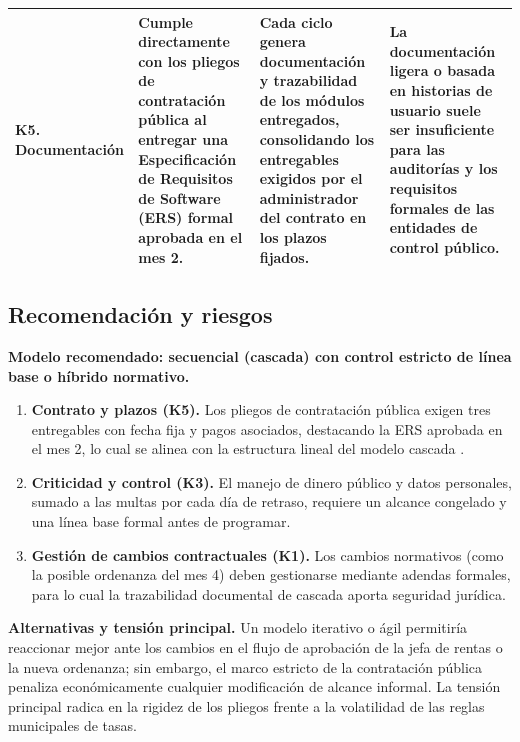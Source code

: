 \documentclass[11pt,a4paper]{article}
\begin{document}
\begin{xltabular}{\textwidth}{|p{0.17\textwidth}|X|X|X|}
K5. Documentación &
Cumple directamente con los pliegos de contratación pública al entregar una Especificación de Requisitos de Software (ERS) formal aprobada en el mes 2. &
Cada ciclo genera documentación y trazabilidad de los módulos entregados, consolidando los entregables exigidos por el administrador del contrato en los plazos fijados. &
La documentación ligera o basada en historias de usuario suele ser insuficiente para las auditorías y los requisitos formales de las entidades de control público.
\\ \hline
\end{xltabular}
\endgroup

\subsection{Recomendación y riesgos}

\textbf{Modelo recomendado: secuencial (cascada) con control estricto de línea base o híbrido normativo.}

\begin{enumerate}
    \item \textbf{Contrato y plazos (K5).} Los pliegos de contratación pública exigen tres entregables con fecha fija y pagos asociados, destacando la ERS aprobada en el mes 2, lo cual se alinea con la estructura lineal del modelo cascada \cite[sec.~5.3]{materialGA}.
    \item \textbf{Criticidad y control (K3).} El manejo de dinero público y datos personales, sumado a las multas por cada día de retraso, requiere un alcance congelado y una línea base formal antes de programar.
    \item \textbf{Gestión de cambios contractuales (K1).} Los cambios normativos (como la posible ordenanza del mes 4) deben gestionarse mediante adendas formales, para lo cual la trazabilidad documental de cascada aporta seguridad jurídica.
\end{enumerate}

\textbf{Alternativas y tensión principal.}
Un modelo iterativo o ágil permitiría reaccionar mejor ante los cambios en el flujo de aprobación de la jefa de rentas o la nueva ordenanza; sin embargo, el marco estricto de la contratación pública penaliza económicamente cualquier modificación de alcance informal. La tensión principal radica en la rigidez de los pliegos frente a la volatilidad de las reglas municipales de tasas.
\end{document}
